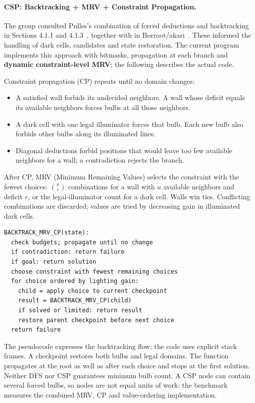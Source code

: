 \paragraph{CSP: Backtracking + MRV + Constraint Propagation.}
The group consulted Pulles's combination of forced deductions and backtracking
in Sections 4.1.1 and 4.1.3~\cite{akari-analysis}, together with
 in Borroot/akari~\cite{akari-code}. These informed the
handling of dark cells, candidates and state restoration. The current program
implements this approach with bitmasks, propagation at each branch and
\textbf{dynamic constraint-level MRV}; the following describes the actual code.

Constraint propagation (CP) repeats until no domain changes:
\begin{itemize}
\item A satisfied wall forbids its undecided neighbors. A wall whose deficit
equals its available neighbors forces bulbs at all those neighbors.
\item A dark cell with one legal illuminator forces that bulb. Each new bulb
also forbids other bulbs along its illuminated lines.
\item Diagonal deductions forbid positions that would leave too few available
neighbors for a wall; a contradiction rejects the branch.
\end{itemize}
After CP, MRV (Minimum Remaining Values) selects the constraint with the fewest
choices: $\binom{u}{r}$ combinations for a wall with $u$ available neighbors and
deficit $r$, or the legal-illuminator count for a dark cell. Walls win ties.
Conflicting combinations are discarded; values are tried by decreasing gain
in illuminated dark cells.
\begin{lstlisting}
BACKTRACK_MRV_CP(state):
  check budgets; propagate until no change
  if contradiction: return failure
  if goal: return solution
  choose constraint with fewest remaining choices
  for choice ordered by lighting gain:
    child = apply choice to current checkpoint
    result = BACKTRACK_MRV_CP(child)
    if solved or limited: return result
    restore parent checkpoint before next choice
  return failure
\end{lstlisting}
The pseudocode expresses the backtracking flow; the code uses explicit stack
frames. A checkpoint restores both bulbs and legal domains. The function
 propagates at the root as well as after each choice
and stops at the first solution. Neither DFS nor CSP guarantees minimum bulb
count. A CSP node can contain several forced bulbs, so nodes are not equal
units of work:
the benchmark measures the combined MRV, CP and value-ordering implementation.

